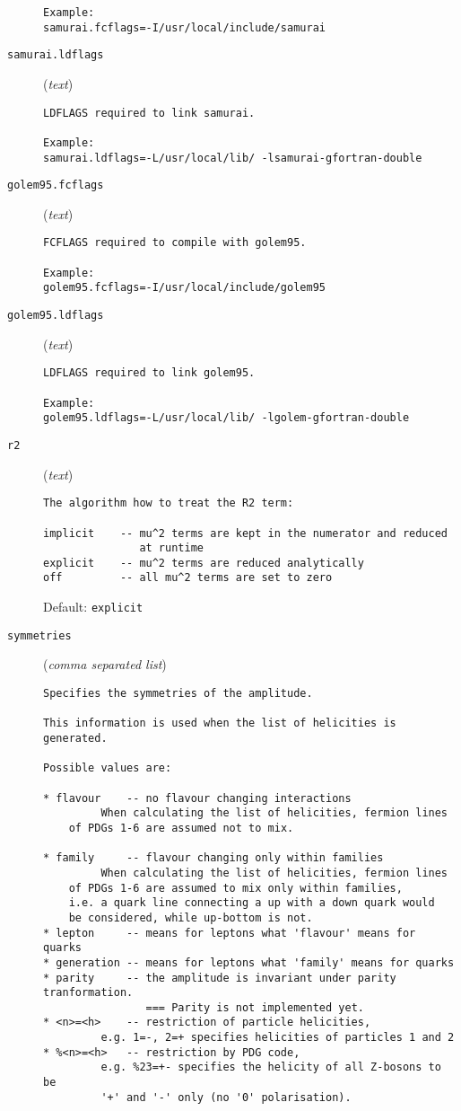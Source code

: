 \begin{description}
\begin{verbatim}
Example:
samurai.fcflags=-I/usr/local/include/samurai
\end{verbatim}
\item[\texttt{samurai.ldflags}] (\textit{text})
\begin{verbatim}
LDFLAGS required to link samurai.

Example:
samurai.ldflags=-L/usr/local/lib/ -lsamurai-gfortran-double
\end{verbatim}
\item[\texttt{golem95.fcflags}] (\textit{text})
\begin{verbatim}
FCFLAGS required to compile with golem95.

Example:
golem95.fcflags=-I/usr/local/include/golem95
\end{verbatim}
\item[\texttt{golem95.ldflags}] (\textit{text})
\begin{verbatim}
LDFLAGS required to link golem95.

Example:
golem95.ldflags=-L/usr/local/lib/ -lgolem-gfortran-double
\end{verbatim}
\item[\texttt{r2}] (\textit{text})
\begin{verbatim}
The algorithm how to treat the R2 term:

implicit    -- mu^2 terms are kept in the numerator and reduced
               at runtime
explicit    -- mu^2 terms are reduced analytically
off         -- all mu^2 terms are set to zero
\end{verbatim}
Default: \verb|explicit|
\item[\texttt{symmetries}] (\textit{comma separated list})
\begin{verbatim}
Specifies the symmetries of the amplitude.

This information is used when the list of helicities is generated.

Possible values are:

* flavour    -- no flavour changing interactions
         When calculating the list of helicities, fermion lines
    of PDGs 1-6 are assumed not to mix.

* family     -- flavour changing only within families
         When calculating the list of helicities, fermion lines
    of PDGs 1-6 are assumed to mix only within families,
    i.e. a quark line connecting a up with a down quark would
    be considered, while up-bottom is not.
* lepton     -- means for leptons what 'flavour' means for quarks
* generation -- means for leptons what 'family' means for quarks
* parity     -- the amplitude is invariant under parity tranformation.
                === Parity is not implemented yet.
* <n>=<h>    -- restriction of particle helicities,
         e.g. 1=-, 2=+ specifies helicities of particles 1 and 2
* %<n>=<h>   -- restriction by PDG code,
         e.g. %23=+- specifies the helicity of all Z-bosons to be
         '+' and '-' only (no '0' polarisation).


\end{verbatim}
\end{description}
